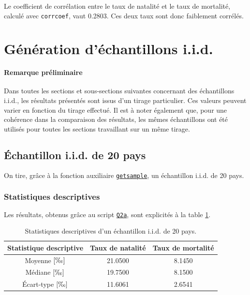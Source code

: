 \documentclass[a4paper, 12pt]{article}
\begin{document}
	Le coefficient de corrélation entre le taux de natalité et le taux de mortalité, calculé avec \texttt{corrcoef}, vaut \num{0.2803}. Ces deux taux sont donc faiblement corrélés.\par
	
	
	\section{Génération d'échantillons i.i.d.}
	
	\paragraph{Remarque préliminaire} Dans toutes les sections et sous-sections suivantes concernant des échantillons i.i.d., les résultats présentés sont issus d'un tirage particulier. Ces valeurs peuvent varier en fonction du tirage effectué. Il est à noter également que, pour une cohérence dans la comparaison des résultats, les mêmes échantillons ont été utilisés pour toutes les sections travaillant sur un même tirage.
	
	\subsection{Échantillon i.i.d. de 20 pays}
	On tire, grâce à la fonction auxiliaire \hyperref[subsec:code-auxiliary]{\texttt{getsample}}, un échantillon i.i.d. de 20 pays.
	
	\subsubsection{Statistiques descriptives}
	Les résultats, obtenus grâce au script \hyperref[subsec:code-Q2]{\texttt{Q2a}}, sont explicités à la table \ref{tab:Q2ai}.\par
	
	\begin{table}[!ht]
	    \centering
	    \begin{tabular}{|c|c|c|}
	        \hline
	        \textbf{Statistique descriptive} & \textbf{Taux de natalité} & \textbf{Taux de mortalité}\\ \hline
	        \hline
	        Moyenne \(\left [\text{\textperthousand} \right ]\) & \num{21.0500} & \num{8.1450}\\ \hline
	        Médiane \(\left [\text{\textperthousand} \right ]\) & \num{19.7500} & \num{8.1500}\\ \hline
	        Écart-type \(\left [\text{\textperthousand} \right ]\) & \num{11.6061} & \num{2.6541}\\ \hline
	    \end{tabular}
	    \caption{Statistiques descriptives d'un échantillon i.i.d. de 20 pays.}
	    \label{tab:Q2ai}
	\end{table}
	
\end{document}
